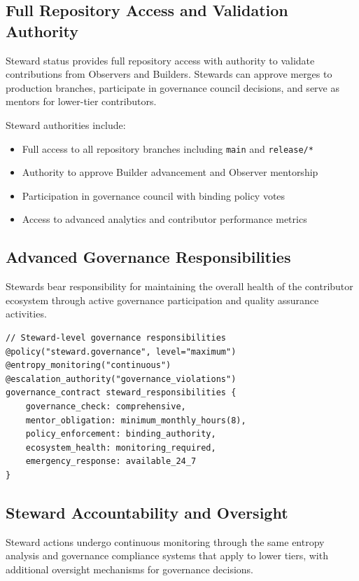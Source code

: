 \subsection{Full Repository Access and Validation Authority}

Steward status provides full repository access with authority to validate contributions from Observers and Builders. Stewards can approve merges to production branches, participate in governance council decisions, and serve as mentors for lower-tier contributors.

Steward authorities include:
\begin{itemize}
\item Full access to all repository branches including \texttt{main} and \texttt{release/*}
\item Authority to approve Builder advancement and Observer mentorship
\item Participation in governance council with binding policy votes
\item Access to advanced analytics and contributor performance metrics
\end{itemize}

\subsection{Advanced Governance Responsibilities}

Stewards bear responsibility for maintaining the overall health of the contributor ecosystem through active governance participation and quality assurance activities.

\begin{lstlisting}[style=riftlang, language=rift]
// Steward-level governance responsibilities
@policy("steward.governance", level="maximum")
@entropy_monitoring("continuous")
@escalation_authority("governance_violations")
governance_contract steward_responsibilities {
    governance_check: comprehensive,
    mentor_obligation: minimum_monthly_hours(8),
    policy_enforcement: binding_authority,
    ecosystem_health: monitoring_required,
    emergency_response: available_24_7
}
\end{lstlisting}

\subsection{Steward Accountability and Oversight}

Steward actions undergo continuous monitoring through the same entropy analysis and governance compliance systems that apply to lower tiers, with additional oversight mechanisms for governance decisions.

